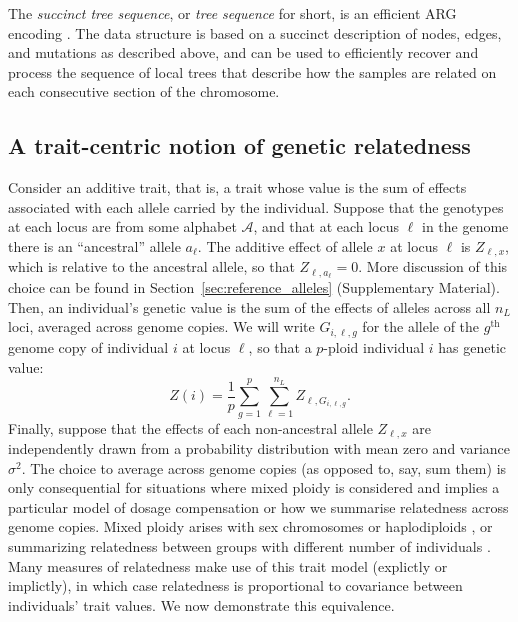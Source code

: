 The \textit{succinct tree sequence}, or \textit{tree sequence} for short,
is an efficient ARG encoding \citep{kelleher2016efficient, kelleher2018efficient, wong2023general}.
%
The data structure is based on a succinct description of nodes, edges,
and mutations as described above,
and can be used to efficiently recover and process
the sequence of local trees that describe how the samples are related
on each consecutive section of the chromosome.
%


\subsection{A trait-centric notion of genetic relatedness}

Consider an additive trait, that is, a trait whose value is
the sum of effects associated with each allele carried by the individual.
%
Suppose that the genotypes at each locus are from some alphabet $\mathcal{A}$,
and that at each locus $\ell$ in the genome there is an ``ancestral'' allele $a_\ell$.
%
The additive effect of allele $x$ at locus $\ell$ is $Z_{\ell,x}$,
which is relative to the ancestral allele, so that $Z_{\ell,a_\ell} = 0$.
%
More discussion of this choice can be found in Section~\ref{sec:reference_alleles} (Supplementary Material).
%
Then, an individual's genetic value is the sum of
the effects of alleles across all $n_L$ loci, %
averaged across genome copies.
%
We will write $G_{i,\ell,g}$ for %
the allele of the $g^\text{th}$ genome copy of individual $i$ at locus $\ell$,
so that a $p$-ploid individual $i$ has genetic value: %
%
$$
Z(i) = \frac{1}{p} \sum_{g=1}^p \sum_{\ell=1}^{n_L} Z_{\ell,G_{i,\ell,g}}.
$$
%
Finally, suppose that the effects of each non-ancestral allele $Z_{\ell,x}$
are independently drawn from a probability distribution with mean zero and variance $\sigma^2$.
%
The choice to average across genome copies (as opposed to, say, sum them)
is only consequential for situations where mixed ploidy is considered
and implies a particular model of dosage compensation or
how we summarise relatedness across genome copies.
%
Mixed ploidy arises with sex chromosomes or haplodiploids \citep{grossman1989inbreeding},
or summarizing relatedness between groups with different number of individuals \citep{cockerham1976group}.
%
Many measures of relatedness make use of this trait model (explictly or implictly),
in which case relatedness is proportional to covariance between individuals' trait values.
%
We now demonstrate this equivalence.

